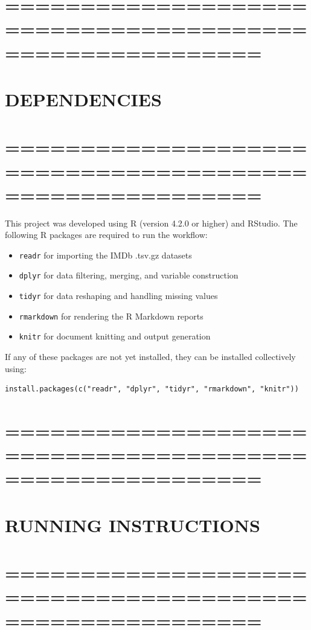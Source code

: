 \documentclass[
]{article}
\providecommand{\tightlist}{%
  \setlength{\itemsep}{0pt}\setlength{\parskip}{0pt}}
\begin{document}
\section{=========================================================}\label{section-16}

\section{DEPENDENCIES}\label{dependencies}

\section{=========================================================}\label{section-17}

This project was developed using R (version 4.2.0 or higher) and
RStudio. The following R packages are required to run the workflow:

\begin{itemize}
\tightlist
\item
  \texttt{readr} for importing the IMDb .tsv.gz datasets
\item
  \texttt{dplyr} for data filtering, merging, and variable construction
\item
  \texttt{tidyr} for data reshaping and handling missing values
\item
  \texttt{rmarkdown} for rendering the R Markdown reports
\item
  \texttt{knitr} for document knitting and output generation
\end{itemize}

If any of these packages are not yet installed, they can be installed
collectively using:

\begin{verbatim}
install.packages(c("readr", "dplyr", "tidyr", "rmarkdown", "knitr"))
\end{verbatim}

\section{=========================================================}\label{section-18}

\section{RUNNING INSTRUCTIONS}\label{running-instructions}

\section{=========================================================}\label{section-19}
\end{document}

